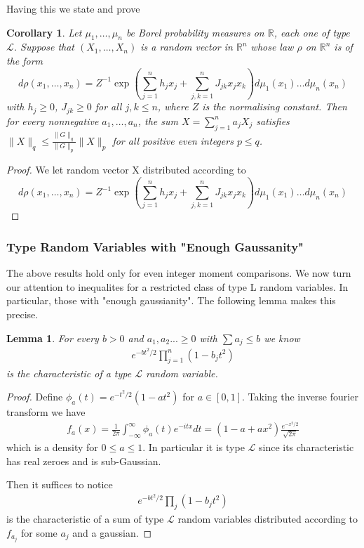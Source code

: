 \documentclass[10pt]{article}
\newcommand{\1}{\textbf{1}}
\newcommand{\R}{\mathbb{R}}
\newtheorem{lemma}[theorem]{Lemma}
\newtheorem{corollary}[theorem]{Corollary}
\theoremstyle{remark}
\theoremstyle{definition}
\begin{document}
Having this we state and prove %

\begin{corollary}
Let $\mu_1, \ldots, \mu_n$ be Borel probability measures on $\R$, each one of type $\mathcal{L}$. Suppose that $(X_1,\dots,X_n)$ is a random vector in $\R^n$ whose law $\rho$ on $\R^n$ is of the form
\begin{equation}
d\rho(x_1,\ldots,x_n) = Z^{-1}\exp\left(\sum_{j=1}^n h_jx_j+\sum_{j,k=1}^n J_{jk}x_jx_k\right)d\mu_1(x_1)\dots d\mu_n(x_n)
\end{equation}
with $h_j \geq 0$, $J_{jk} \geq 0$ for all $j,k \leq n$, where $Z$ is the normalising constant. Then for every nonnegative $a_1, \ldots, a_n$, the sum $X = \sum_{j=1}^n a_jX_j$ satisfies $\|X\|_q \leq \frac{\|G\|_q}{\|G\|_p}\|X\|_p$ for all positive even integers $p \leq q$.
\end{corollary}

\begin{proof}
	We let random vector X distributed according to 
	\begin{equation}
		d\rho(x_1,\ldots,x_n) = Z^{-1}\exp\left(\sum_{j=1}^n h_jx_j+\sum_{j,k=1}^n J_{jk}x_jx_k\right)d\mu_1(x_1)\dots d\mu_n(x_n)
	\end{equation}
\end{proof}

\subsubsection{Type  Random Variables with "Enough Gaussanity"}

The above results hold only for even integer moment comparisons. We now turn our attention to inequalites for a restricted class of type L random variables. In particular, those with "enough gaussianity". The following lemma makes this precise.

\begin{lemma}
	For every $b > 0$ and $a_1,a_2...\geq 0$ with $\sum a_j \leq b$ we know
	\begin{align*}
		e^{-bt^2/2}\prod_{j=1}^n (1-b_jt^2)
	\end{align*} 
	is the characteristic of a type $\mathcal{L}$ random variable. 
\end{lemma}

\begin{proof}
	Define $\phi_a(t) = e^{-t^2/2}(1-at^2)$ for $a \in [0,1]$. Taking the inverse fourier transform we have
	\begin{align*}
		f_a(x) = \frac{1}{2\pi}\int_{-\infty}^{\infty}\phi_a(t)e^{-itx}dt = (1-a+ax^2)\frac{e^{-x^2/2}}{\sqrt{2\pi}}
	\end{align*}
	which is a density for $0 \leq a \leq 1$. In particular it is type $\mathcal{L}$ since its characteristic has real zeroes and is sub-Gaussian.

	Then it suffices to notice 
	\begin{align*}
		e^{-bt^2/2}\prod_j (1-b_jt^2)
	\end{align*} 
	is the characteristic of a sum of type $\mathcal{L}$ random variables distributed according to $f_{a_j}$ for some $a_j$ and a gaussian. 
\end{proof}
\end{document}
